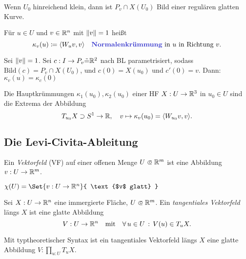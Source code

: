 \documentclass{cheat-sheet}
\newcommand{\Bild}{\mathrm{Bild}}
\begin{document}
\begin{satz}
  Wenn $U_0$ hinreichend klein, dann ist $P_v \cap X(U_0)$ Bild einer regulären glatten Kurve.
\end{satz}

\begin{defn}
  Für $u \in U$ und $v \in \mathbb{R}^n$ mit $\lVert v\rVert = 1$ heißt
  \[
    \kappa_v(u) \coloneqq \langle W_u v, v \rangle
    \quad \text{\emph{Normalenkrümmung} in $u$ in Richtung $v$}.
  \]
\end{defn}

\begin{samepage}

\begin{bem}
  Sei $\lVert v\rVert = 1$. Sei $c : I \to P_v \tilde{=} \mathbb{R}^2$ nach BL parametrisiert, sodass $\Bild(c) = P_v \cap X(U_0)$, und $c(0) = X(u_0)$ und $c'(0) = v$. Dann: $\kappa_v(u) = \kappa_c(0)$
\end{bem}

\begin{satz}
  Die Hauptkrümmungen $\kappa_1(u_0), \kappa_2(u_0)$ einer HF $X : U \to \mathbb{R}^3$ in $u_0 \in U$ sind die Extrema der Abbildung
  \[ T_{u_0} X \supset S^1 \to \mathbb{R}, \quad v \mapsto \kappa_v(u_0) = \langle W_{u_0} v, v \rangle. \]
\end{satz}

\subsection{Die Levi-Civita-Ableitung}

\end{samepage}

\begin{defn}
  Ein \emph{Vektorfeld} (VF) auf einer offenen Menge $U \opn \R^m$ ist eine Abbildung $v : U \to \mathbb{R}^m$.
\end{defn}

\begin{nota}
  $\chi(U) = \Set{ v : U \to \R^n }{ \text{$v$ glatt} }$
\end{nota}

\begin{defn}
  Sei $X : U \to \mathbb{R}^n$ eine immergierte Fläche, $U \opn \R^m$. Ein \emph{tangentiales Vektorfeld} längs $X$ ist eine glatte Abbildung
  \[
    V : U \to \mathbb{R}^n
    \quad \text{mit} \quad
    \forall \, {u \in U} \,:\, V(u) \in T_u X.
  \]
\end{defn}

\begin{bem}
  Mit typtheoretischer Syntax ist ein tangentiales Vektorfeld längs $X$ eine glatte Abbildung $V : \prod_{u : U} T_u X$.
\end{bem}
\end{document}
